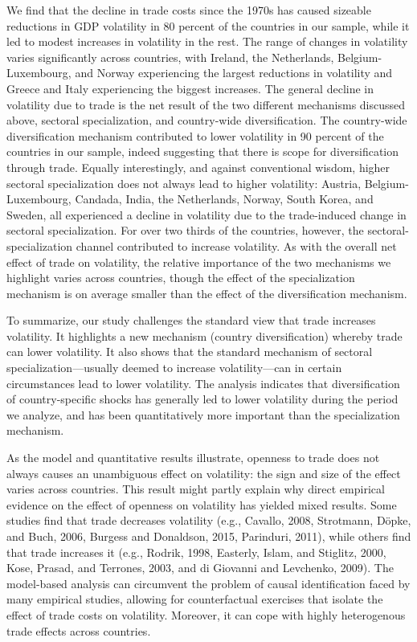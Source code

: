 \documentclass[12pt]{article}
\begin{document}
We find that the decline in trade costs since the 1970s has caused sizeable
reductions in GDP volatility in 80 percent of the countries in our sample,
while it led to modest increases in volatility in the rest. The range of
changes in volatility varies significantly across countries, with Ireland,
the Netherlands, Belgium-Luxembourg, and Norway experiencing the largest
reductions in volatility and Greece and Italy experiencing the biggest
increases. The general decline in volatility due to trade is the net result
of the two different mechanisms discussed above, sectoral specialization,
and country-wide diversification. The country-wide diversification mechanism
contributed to lower volatility in 90 percent of the countries in our
sample, indeed suggesting that there is scope for diversification through
trade. Equally interestingly, and against conventional wisdom, higher
sectoral specialization does not always lead to higher volatility: Austria,
Belgium-Luxembourg, Candada, India, the Netherlands, Norway, South Korea,
and Sweden, all experienced a decline in volatility due to the trade-induced
change in sectoral specialization. For over two thirds of the countries,
however, the sectoral-specialization channel contributed to increase
volatility. As with the overall net effect of trade on volatility, the
relative importance of the two mechanisms we highlight varies across
countries, though the effect of the specialization mechanism is on average
smaller than the effect of the diversification mechanism.

To summarize, our study challenges the standard view that trade increases
volatility. It highlights a new mechanism (country diversification) whereby
trade can lower volatility. It also shows that the standard mechanism of
sectoral specialization---usually deemed to increase volatility---can in
certain circumstances lead to lower volatility. The analysis indicates that
diversification of country-specific shocks has generally led to lower
volatility during the period we analyze, and has been quantitatively more
important than the specialization mechanism.

As the model and quantitative results illustrate, openness to trade does not
always causes an unambiguous effect on volatility: the sign and size of the
effect varies across countries. This result might partly explain why direct
empirical evidence on the effect of openness on volatility has yielded mixed
results. Some studies find that trade decreases volatility (e.g., Cavallo,
2008, Strotmann, D\"{o}pke, and Buch, 2006, Burgess and Donaldson, 2015,
Parinduri, 2011), while others find that trade increases it (e.g., Rodrik,
1998, Easterly, Islam, and Stiglitz, 2000, Kose, Prasad, and Terrones, 2003,
and di Giovanni and Levchenko, 2009). The model-based analysis can
circumvent the problem of causal identification faced by many empirical
studies, allowing for counterfactual exercises that isolate the effect of
trade costs on volatility. Moreover, it can cope with highly heterogenous
trade effects across countries.
\end{document}
